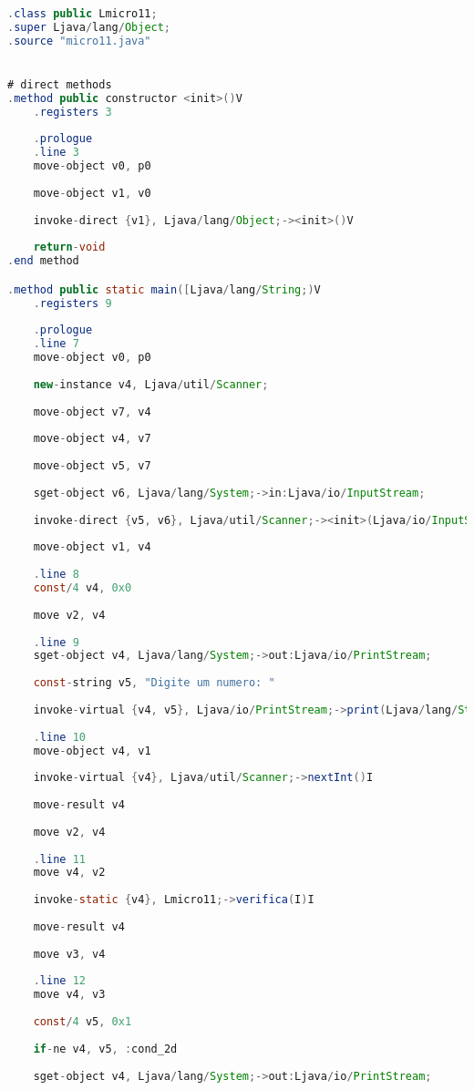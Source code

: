 \documentclass[hidelinks,12pt]{article}
\begin{document}
	\begin{lstlisting}[caption=Smali resultante do .java,language=java]
.class public Lmicro11;
.super Ljava/lang/Object;
.source "micro11.java"


# direct methods
.method public constructor <init>()V
	.registers 3
	
	.prologue
	.line 3
	move-object v0, p0
	
	move-object v1, v0
	
	invoke-direct {v1}, Ljava/lang/Object;-><init>()V
	
	return-void
.end method

.method public static main([Ljava/lang/String;)V
	.registers 9
	
	.prologue
	.line 7
	move-object v0, p0
	
	new-instance v4, Ljava/util/Scanner;
	
	move-object v7, v4
	
	move-object v4, v7
	
	move-object v5, v7
	
	sget-object v6, Ljava/lang/System;->in:Ljava/io/InputStream;
	
	invoke-direct {v5, v6}, Ljava/util/Scanner;-><init>(Ljava/io/InputStream;)V
	
	move-object v1, v4
	
	.line 8
	const/4 v4, 0x0
	
	move v2, v4
	
	.line 9
	sget-object v4, Ljava/lang/System;->out:Ljava/io/PrintStream;
	
	const-string v5, "Digite um numero: "
	
	invoke-virtual {v4, v5}, Ljava/io/PrintStream;->print(Ljava/lang/String;)V
	
	.line 10
	move-object v4, v1
	
	invoke-virtual {v4}, Ljava/util/Scanner;->nextInt()I
	
	move-result v4
	
	move v2, v4
	
	.line 11
	move v4, v2
	
	invoke-static {v4}, Lmicro11;->verifica(I)I
	
	move-result v4
	
	move v3, v4
	
	.line 12
	move v4, v3
	
	const/4 v5, 0x1
	
	if-ne v4, v5, :cond_2d
	
	sget-object v4, Ljava/lang/System;->out:Ljava/io/PrintStream;
	

\end{lstlisting}
\end{document}
